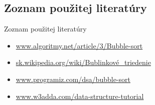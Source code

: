 \documentclass[11pt]{beamer}
\begin{document}
\subsection{Zoznam použitej literatúry}
\begin{frame}{Zoznam použitej literatúry}
    \begin{itemize}
        \setlength\itemsep{1,5em}
        \item \href{https://www.algoritmy.net/article/3/Bubble-sort}{www.algoritmy.net/article/3/Bubble-sort}
        \item \href{https://sk.wikipedia.org/wiki/Bublinkové_triedenie}{sk.wikipedia.org/wiki/Bublinkové\_triedenie}
        \item \href{https://www.programiz.com/dsa/bubble-sort}{www.programiz.com/dsa/bubble-sort}
        \item \href{https://www.w3adda.com/data-structure-tutorial/bubble-sort-algorithm}{www.w3adda.com/data-structure-tutorial}
    \end{itemize}
\end{frame}
\end{document}
